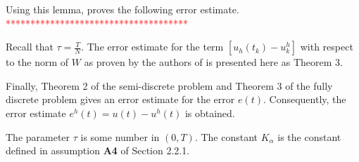 \documentclass[../../main.tex]{subfiles}
\begin{document}
Using this lemma, \cite{BV13} proves the following error estimate.\\
\textcolor{red}{*************************************}

Recall that $\displaystyle \tau = \frac{T}{N}$. The error estimate for the term
$[u_h(t_k) - u^h_k]$ with respect to the norm of $W$ as proven by the authors
of \cite{BV13} is presented here as Theorem 3.

Finally, Theorem 2 of the semi-discrete problem and Theorem 3 of the fully
discrete problem gives an error estimate for the error $e(t)$. Consequently,
the error estimate $e^h(t) = u(t) - u^h(t)$ is obtained.



The parameter $\tau$ is some number in $(0,T)$. The constant $K_\alpha$ is the constant defined in assumption \textbf{A4} of Section 2.2.1.
\end{document}
